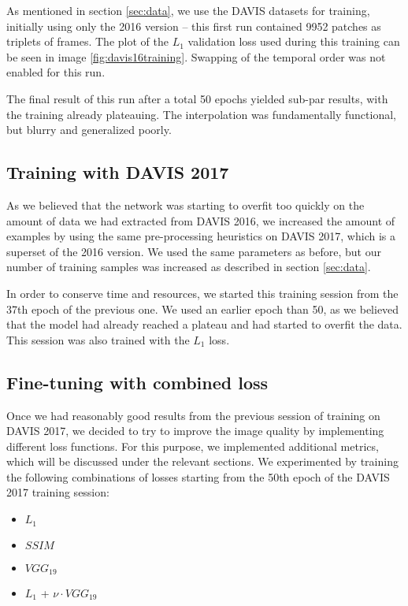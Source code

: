 \documentclass[10pt,twocolumn,letterpaper]{article}
\begin{document}
As mentioned in section \ref{sec:data}, we use the DAVIS datasets for training, initially using only the 2016 version -- this first run contained 9952 patches as triplets of frames. The plot of the $L_1$ validation loss used during this training can be seen in image \ref{fig:davis16training}. Swapping of the temporal order was not enabled for this run.

The final result of this run after a total 50 epochs yielded sub-par results, with the training already plateauing. The interpolation was fundamentally functional, but blurry and generalized poorly.


\subsection{Training with DAVIS 2017}
As we believed that the network was starting to overfit too quickly on the amount of data we had extracted from DAVIS 2016, we increased the amount of examples by using the same pre-processing heuristics on DAVIS 2017, which is a superset of the 2016 version. We used the same parameters as before, but our number of training samples was increased as described in section \ref{sec:data}.

In order to conserve time and resources, we started this training session from the 37th epoch of the previous one. We used an earlier epoch than 50, as we believed that the model had already reached a plateau and had started to overfit the data. This session was also trained with the $L_1$ loss.


\subsection{Fine-tuning with combined loss}
Once we had reasonably good results from the previous session of training on DAVIS 2017, we decided to try to improve the image quality by implementing different loss functions. For this purpose, we implemented additional metrics, which will be discussed under the relevant sections. We experimented by training the following combinations of losses starting from the 50th epoch of the DAVIS 2017 training session:

\begin{itemize}
    \item $L_1$
    \item $SSIM$
    \item $VGG_{19}$
    \item $L_1$ + $\nu \cdot VGG_{19}$
\end{itemize}
\end{document}
